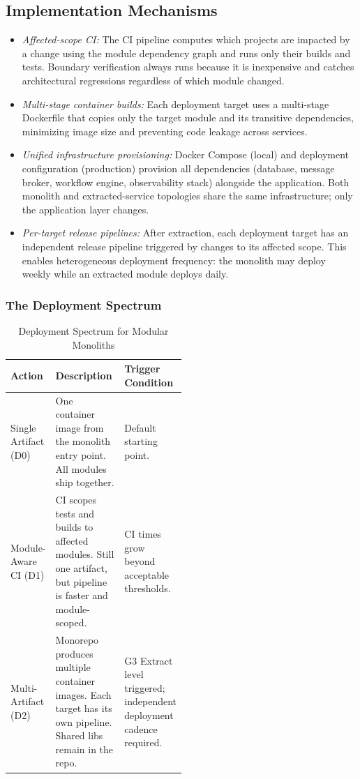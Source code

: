 \subsection*{Implementation Mechanisms}

\begin{itemize}[itemsep=8pt,topsep=2pt]
  \item \emph{Affected-scope CI:} The CI pipeline computes which projects are impacted by a change using the module dependency graph and runs only their builds and tests. Boundary verification always runs because it is inexpensive and catches architectural regressions regardless of which module changed.

  \item \emph{Multi-stage container builds:} Each deployment target uses a multi-stage Dockerfile that copies only the target module and its transitive dependencies, minimizing image size and preventing code leakage across services.

  \item \emph{Unified infrastructure provisioning:} Docker Compose (local) and deployment configuration (production) provision all dependencies (database, message broker, workflow engine, observability stack) alongside the application. Both monolith and extracted-service topologies share the same infrastructure; only the application layer changes.

  \item \emph{Per-target release pipelines:} After extraction, each deployment target has an independent release pipeline triggered by changes to its affected scope. This enables heterogeneous deployment frequency: the monolith may deploy weekly while an extracted module deploys daily.
\end{itemize}


\subsubsection*{The Deployment Spectrum}

\begin{table}[H]
\centering
\small
\caption{Deployment Spectrum for Modular Monoliths}
\label{tab:deployment-spectrum}
\begin{tabularx}{\linewidth}{p{0.22\linewidth} X p{0.28\linewidth}}
\toprule
\textbf{Action} & \textbf{Description} & \textbf{Trigger Condition} \\
\midrule
Single Artifact (D0) & One container image from the monolith entry point. All modules ship together. & Default starting point. \\
Module-Aware CI (D1) & CI scopes tests and builds to affected modules. Still one artifact, but pipeline is faster and module-scoped. & CI times grow beyond acceptable thresholds. \\
Multi-Artifact (D2) & Monorepo produces multiple container images. Each target has its own pipeline. Shared libs remain in the repo. & G3 Extract level triggered; independent deployment cadence required. \\
\bottomrule
\end{tabularx}
\end{table}

